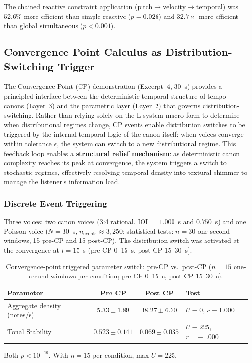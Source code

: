 \documentclass[a4paper]{article}
\newcommand{\tbl}[2]{\caption{#1}\centering#2}
\newcommand{\tabnote}[1]{\par\vspace{0.5ex}\footnotesize#1}
\theoremstyle{definition}
\theoremstyle{remark}
\begin{document}
The chained reactive constraint application (pitch$\rightarrow$velocity$\rightarrow$temporal) was $52.6\%$ more efficient than simple reactive ($p = 0.026$) and $32.7\times$ more efficient than global simultaneous ($p < 0.001$).

\subsection{Convergence Point Calculus as Distribution-Switching Trigger}
\label{sec:convergence}

The Convergence Point (CP) demonstration (Excerpt~4, 30~s) provides a principled interface between the deterministic temporal structure of tempo canons (Layer~3) and the parametric layer (Layer~2) that governs distribution-switching. Rather than relying solely on the L-system macro-form to determine when distributional regimes change, CP events enable distribution switches to be triggered by the internal temporal logic of the canon itself: when voices converge within tolerance $\epsilon$, the system can switch to a new distributional regime. This feedback loop enables a \textbf{structural relief mechanism}: as deterministic canon complexity reaches its peak at convergence, the system triggers a switch to stochastic regimes, effectively resolving temporal density into textural shimmer to manage the listener's information load.

\subsubsection{Discrete Event Triggering}

Three voices: two canon voices (3:4 rational, IOI $= 1.000$~s and $0.750$~s) and one Poisson voice ($N = 30$~s, $n_{\text{events}} \approx 3{,}250$; statistical tests: $n = 30$ one-second windows, 15 pre-CP and 15 post-CP). The distribution switch was activated at the convergence at $t = 15$~s (pre-CP 0--15~s, post-CP 15--30~s).

\begin{table}[htbp]
\tbl{Convergence-point triggered parameter switch: pre-CP vs.\ post-CP ($n = 15$ one-second windows per condition; pre-CP 0--15~s, post-CP 15--30~s).}
{\begin{tabular}{@{}lccl@{}} \toprule
\textbf{Parameter} & \textbf{Pre-CP} & \textbf{Post-CP} & \textbf{Test} \\ \midrule
Aggregate density (notes/s) & $5.33 \pm 1.89$ & $38.27 \pm 6.30$ & $U=0$, $r = 1.000$ \\
Tonal Stability & $0.523 \pm 0.141$ & $0.069 \pm 0.035$ & $U=225$, $r = -1.000$ \\ \bottomrule
\end{tabular}}
\tabnote{Both $p < 10^{-10}$. With $n = 15$ per condition, max $U = 225$.}
\label{tab:cp_discrete}
\end{table}
\end{document}
